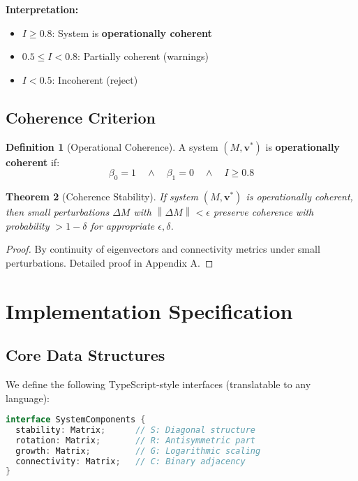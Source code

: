 \documentclass[11pt,a4paper]{article}
\newtheorem{theorem}{Theorem}[section]
\theoremstyle{definition}
\newtheorem{definition}[theorem]{Definition}
\theoremstyle{remark}
\newcommand{\norm}[1]{\left\|#1\right\|}
\begin{document}
\textbf{Interpretation:}
\begin{itemize}
\item $I \geq 0.8$: System is \textbf{operationally coherent}
\item $0.5 \leq I < 0.8$: Partially coherent (warnings)
\item $I < 0.5$: Incoherent (reject)
\end{itemize}

\subsection{Coherence Criterion}

\begin{definition}[Operational Coherence]\label{def:coherence}
A system $(M, \mathbf{v}^*)$ is \textbf{operationally coherent} if:
\begin{equation}
\beta_0 = 1 \quad \land \quad \beta_1 = 0 \quad \land \quad I \geq 0.8
\end{equation}
\end{definition}

\begin{theorem}[Coherence Stability]\label{thm:stability}
If system $(M, \mathbf{v}^*)$ is operationally coherent, then small perturbations $\Delta M$ with $\norm{\Delta M} < \epsilon$ preserve coherence with probability $> 1 - \delta$ for appropriate $\epsilon, \delta$.
\end{theorem}

\begin{proof}
By continuity of eigenvectors and connectivity metrics under small perturbations. Detailed proof in Appendix A.
\end{proof}

\section{Implementation Specification}

\subsection{Core Data Structures}

We define the following TypeScript-style interfaces (translatable to any language):

\begin{lstlisting}[language=Java, caption=System Components Interface]
interface SystemComponents {
  stability: Matrix;      // S: Diagonal structure
  rotation: Matrix;       // R: Antisymmetric part
  growth: Matrix;         // G: Logarithmic scaling
  connectivity: Matrix;   // C: Binary adjacency
}
\end{lstlisting}
\end{document}
